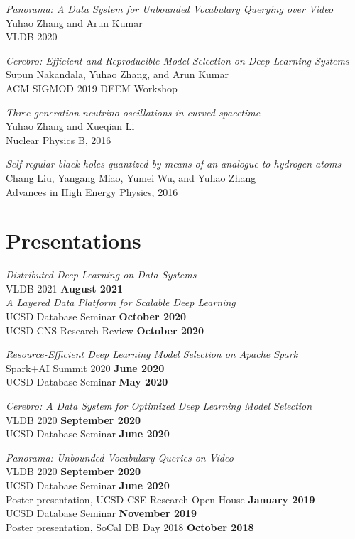 \documentclass[margin,line]{res}
\begin{document}
\begin{resume}
\textit{Panorama: A Data System for Unbounded Vocabulary Querying over Video}\\
Yuhao Zhang and Arun Kumar\\
VLDB 2020

\textit{Cerebro: Efficient and Reproducible Model Selection on Deep Learning Systems}\\
Supun Nakandala, Yuhao Zhang, and Arun Kumar\\
ACM SIGMOD 2019 DEEM Workshop

\textit{Three-generation neutrino oscillations in curved spacetime}\\
Yuhao Zhang and Xueqian Li\\
Nuclear Physics B, 2016

\textit{Self-regular black holes quantized by means of an analogue to hydrogen atoms}\\
Chang Liu, Yangang Miao, Yumei Wu, and Yuhao Zhang\\
Advances in High Energy Physics, 2016

\section{\sc Presentations}
\textit{Distributed Deep Learning on Data Systems}\\
VLDB 2021 \hfill {\bf August 2021}\\

\textit{A Layered Data Platform for Scalable Deep Learning}\\
UCSD Database Seminar \hfill {\bf October 2020}\\
UCSD CNS Research Review \hfill {\bf October 2020}

\vspace{-3mm}
\textit{Resource-Efficient Deep Learning Model Selection on Apache Spark}\\
Spark+AI Summit 2020 \hfill {\bf June 2020}\\
UCSD Database Seminar \hfill {\bf May 2020}

\vspace{-3mm}
\textit{Cerebro: A Data System for Optimized Deep Learning Model Selection}\\
VLDB 2020 \hfill {\bf September 2020}\\
UCSD Database Seminar \hfill {\bf June 2020}

\vspace{-3mm}
\textit{Panorama: Unbounded Vocabulary Queries on Video}\\
VLDB 2020 \hfill {\bf September 2020}\\
UCSD Database Seminar \hfill {\bf June 2020}\\
Poster presentation, UCSD CSE Research Open House \hfill {\bf January 2019}\\
UCSD Database Seminar \hfill {\bf November 2019}\\
Poster presentation, SoCal DB Day 2018 \hfill {\bf October 2018}


\end{resume}
\end{document}
